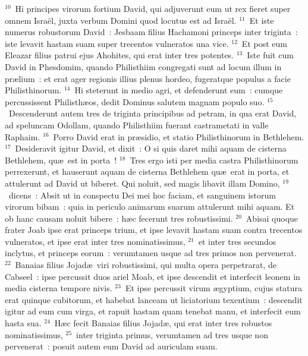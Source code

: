 ${}^{10}$~Hi principes virorum fortium David, qui adjuverunt eum ut rex fieret super omnem Isra\"el, juxta verbum Domini quod locutus est ad Isra\"el.
${}^{11}$~Et iste numerus robustorum David~: Jesbaam filius Hachamoni princeps inter triginta~: iste levavit hastam suam super trecentos vulneratos una vice.
${}^{12}$~Et post eum Eleazar filius patrui ejus Ahohites, qui erat inter tres potentes.
${}^{13}$~Iste fuit cum David in Phesdomim, quando Philisthiim congregati sunt ad locum illum in pr\ae lium~: et erat ager regionis illius plenus hordeo, fugeratque populus a facie Philisthinorum.
${}^{14}$~Hi steterunt in medio agri, et defenderunt eum~: cumque percussissent Philisth\ae os, dedit Dominus salutem magnam populo suo.
${}^{15}$~Descenderunt autem tres de triginta principibus ad petram, in qua erat David, ad speluncam Odollam, quando Philisthiim fuerant castrametati in valle Raphaim.
${}^{16}$~Porro David erat in pr\ae sidio, et statio Philisthinorum in Bethlehem.
${}^{17}$~Desideravit igitur David, et dixit~: O si quis daret mihi aquam de cisterna Bethlehem, qu\ae\ est in porta~!
${}^{18}$~Tres ergo isti per media castra Philisthinorum perrexerunt, et hauserunt aquam de cisterna Bethlehem qu\ae\ erat in porta, et attulerunt ad David ut biberet. Qui noluit, sed magis libavit illam Domino,
${}^{19}$~dicens~: Absit ut in conspectu Dei mei hoc faciam, et sanguinem istorum virorum bibam~: quia in periculo animarum suarum attulerunt mihi aquam. Et ob hanc causam noluit bibere~: h\ae c fecerunt tres robustissimi.
${}^{20}$~Abisai quoque frater Joab ipse erat princeps trium, et ipse levavit hastam suam contra trecentos vulneratos, et ipse erat inter tres nominatissimus,
${}^{21}$~et inter tres secundos inclytus, et princeps eorum~: verumtamen usque ad tres primos non pervenerat.
${}^{22}$~Banaias filius Jojad\ae\ viri robustissimi, qui multa opera perpetrarat, de Cabseel~: ipse percussit duos ariel Moab, et ipse descendit et interfecit leonem in media cisterna tempore nivis.
${}^{23}$~Et ipse percussit virum \ae gyptium, cujus statura erat quinque cubitorum, et habebat lanceam ut liciatorium texentium~: descendit igitur ad eum cum virga, et rapuit hastam quam tenebat manu, et interfecit eum hasta sua.
${}^{24}$~H\ae c fecit Banaias filius Jojad\ae , qui erat inter tres robustos nominatissimus,
${}^{25}$~inter triginta primus, verumtamen ad tres usque non pervenerat~: posuit autem eum David ad auriculam suam.


